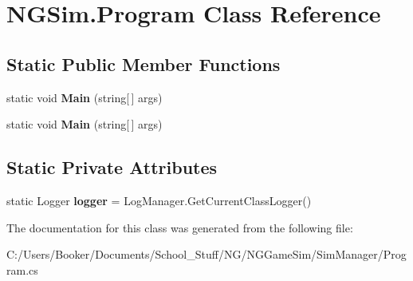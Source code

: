 \hypertarget{class_n_g_sim_1_1_program}{}\section{N\+G\+Sim.\+Program Class Reference}
\label{class_n_g_sim_1_1_program}
\subsection*{Static Public Member Functions}
\begin{DoxyCompactItemize}
\item 
\mbox{\label{class_n_g_sim_1_1_program_aa7aad34f11b53cb0dc26242f4815934f}} 
static void {\bfseries Main} (string\mbox{[}$\,$\mbox{]} args)
\item 
\mbox{\label{class_n_g_sim_1_1_program_aa7aad34f11b53cb0dc26242f4815934f}} 
static void {\bfseries Main} (string\mbox{[}$\,$\mbox{]} args)
\end{DoxyCompactItemize}
\subsection*{Static Private Attributes}
\begin{DoxyCompactItemize}
\item 
\mbox{\label{class_n_g_sim_1_1_program_aecd4808f5d377820c482b3338cdca53f}} 
static Logger {\bfseries logger} = Log\+Manager.\+Get\+Current\+Class\+Logger()
\end{DoxyCompactItemize}


The documentation for this class was generated from the following file\+:\begin{DoxyCompactItemize}
\item 
C\+:/\+Users/\+Booker/\+Documents/\+School\+\_\+\+Stuff/\+N\+G/\+N\+G\+Game\+Sim/\+Sim\+Manager/Program.\+cs\end{DoxyCompactItemize}
